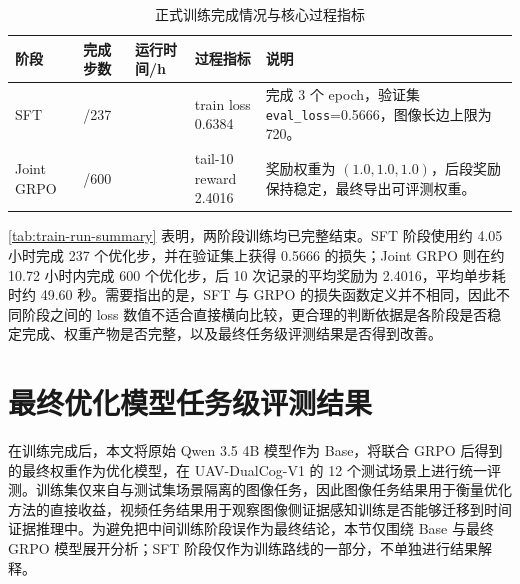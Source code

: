 \begin{table}[!htbp]
    \centering
    \caption{正式训练完成情况与核心过程指标}
    \label{tab:train-run-summary}
    \footnotesize
    \setlength{\tabcolsep}{4pt}
    \begin{tabularx}{\textwidth}{@{}p{1.9cm}>{\centering\arraybackslash}p{1.6cm}>{\centering\arraybackslash}p{1.6cm}>{\centering\arraybackslash}p{2.0cm}X@{}}
        \toprule
        阶段 & 完成步数 & 运行时间/h & 过程指标 & 说明 \\
        \midrule
        SFT & 237/237 & 4.05 & \makecell[c]{train loss\\0.6384} & 完成 3 个 epoch，验证集 \texttt{eval\_loss}=0.5666，图像长边上限为 720。 \\
        Joint GRPO & 600/600 & 10.72 & \makecell[c]{tail-10 reward\\2.4016} & 奖励权重为 \((1.0,1.0,1.0)\)，后段奖励保持稳定，最终导出可评测权重。 \\
        \bottomrule
    \end{tabularx}
\end{table}

\autoref{tab:train-run-summary} 表明，两阶段训练均已完整结束。SFT 阶段使用约 4.05 小时完成 237 个优化步，并在验证集上获得 0.5666 的损失；Joint GRPO 则在约 10.72 小时内完成 600 个优化步，后 10 次记录的平均奖励为 2.4016，平均单步耗时约 49.60 秒。需要指出的是，SFT 与 GRPO 的损失函数定义并不相同，因此不同阶段之间的 loss 数值不适合直接横向比较，更合理的判断依据是各阶段是否稳定完成、权重产物是否完整，以及最终任务级评测结果是否得到改善。

\FloatBarrier
\section{最终优化模型任务级评测结果}

在训练完成后，本文将原始 Qwen 3.5 4B 模型作为 Base，将联合 GRPO 后得到的最终权重作为优化模型，在 UAV-DualCog-V1 的 12 个测试场景上进行统一评测。训练集仅来自与测试集场景隔离的图像任务，因此图像任务结果用于衡量优化方法的直接收益，视频任务结果用于观察图像侧证据感知训练是否能够迁移到时间证据推理中。为避免把中间训练阶段误作为最终结论，本节仅围绕 Base 与最终 GRPO 模型展开分析；SFT 阶段仅作为训练路线的一部分，不单独进行结果解释。

